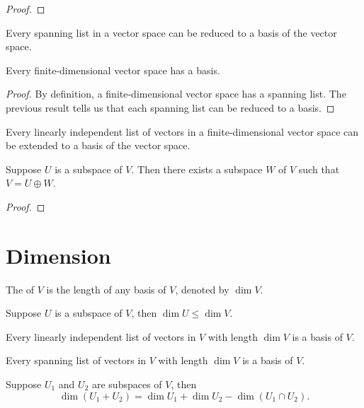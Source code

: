 \begin{proof}

\end{proof}

\begin{proposition}
Every spanning list in a vector space can be reduced to a basis of the vector space.
\end{proposition}

\begin{proposition}
Every finite-dimensional vector space has a basis.
\end{proposition}

\begin{proof}
By definition, a finite-dimensional vector space has a spanning list. The previous result tells us that each spanning list can be reduced to a basis.
\end{proof}

\begin{proposition}
Every linearly independent list of vectors in a finite-dimensional vector space can be extended to a basis of the vector space.
\end{proposition}

\begin{proposition}
Suppose $U$ is a subspace of $V$. Then there exists a subspace $W$ of $V$ such that $V=U\oplus W$.
\end{proposition}

\begin{proof}

\end{proof}

\section{Dimension}
\begin{definition}[Dimension]
The  of $V$ is the length of any basis of $V$, denoted by $\dim V$.
\end{definition}

\begin{proposition}
Suppose $U$ is a subspace of $V$, then $\dim U\le\dim V$.
\end{proposition}

\begin{proposition}
Every linearly independent list of vectors in $V$ with length $\dim V$ is a basis of $V$.
\end{proposition}

\begin{proposition}
Every spanning list of vectors in $V$ with length $\dim V$ is a basis of $V$.
\end{proposition}

\begin{lemma}
Suppose $U_1$ and $U_2$ are subspaces of $V$, then
\[\dim(U_1+U_2)=\dim U_1+\dim U_2-\dim(U_1\cap U_2).\]
\end{lemma}